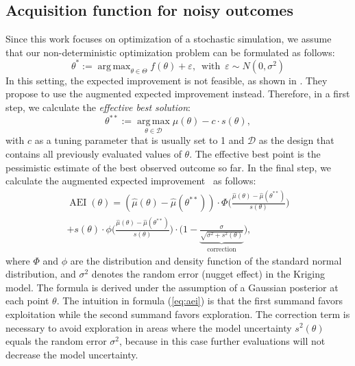 \documentclass[bimj,fleqn]{w-art}
\theoremstyle{plain}
\theoremstyle{definition}
\begin{document}
\subsection{Acquisition function for noisy outcomes}
Since this work focuses on optimization of a stochastic simulation, we assume that our non-deterministic optimization problem can be formulated as follows:
\begin{equation}
\theta^\ast := \operatorname{arg\,max}_{\theta \in \Theta} f(\theta) + \varepsilon, \, \text{ with } \, \varepsilon \sim N(0, \sigma^2) %
\end{equation}
In this setting, the expected improvement is not feasible, as shown in \citet{huang_global_2006}.
They propose to use the augmented expected improvement instead.
Therefore, in a first step, we calculate the \emph{effective best solution}:
\begin{equation}
  \theta^{\ast\ast} := \operatorname{arg\,max}\limits_{\theta \in \mathcal{D}} \hat{\mu}(\theta) - c \cdot s(\theta),
\end{equation}
with $c$ as a tuning parameter that is usually set to 1 and $\mathcal{D}$ as the design that contains all previously evaluated values of $\theta$.
The effective best point is the pessimistic estimate of the best observed outcome so far.
In the final step, we calculate the augmented expected improvement~\citep{huang_global_2006} as follows:
\begin{multline}
  \label{eq:aei}
  \operatorname{AEI}(\theta) = \left( \hat{\mu}(\theta) - \hat{\mu}(\theta^{\ast\ast}) \right) \cdot  \Phi \biggl( \frac{\hat{\mu}(\theta) - \hat{\mu}(\theta^{\ast\ast})}{s(\theta)} \biggr) \\
   + s(\theta) \cdot \phi \biggl( \frac{\hat{\mu}(\theta) - \hat{\mu}(\theta^{\ast\ast})}{s(\theta)} \biggr) \cdot \biggl(1 - \underbrace{\frac{\sigma}{\sqrt{\sigma^2 + s^2(\theta)}}}_{\text{correction}}\biggr),
\end{multline}
where $\Phi$ and $\phi$ are the distribution and density function of the standard normal distribution, and $\sigma^2$ denotes the random error (nugget effect) in the Kriging model.
The formula is derived under the assumption of a Gaussian posterior at each point $\theta$.
The intuition in formula (\ref{eq:aei}) is that the first summand favors exploitation while the second summand favors exploration.
The correction term is necessary to avoid exploration in areas where the model uncertainty $s^2(\theta)$ equals the random error $\sigma^2$, because in this case further evaluations will not decrease the model uncertainty.
\end{document}
